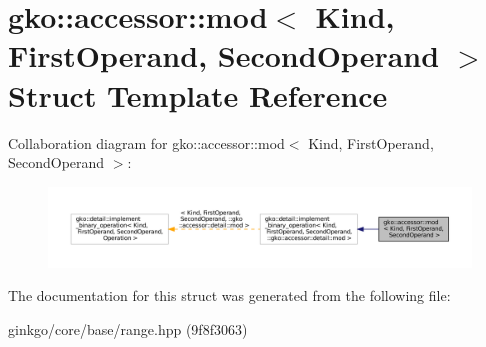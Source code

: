 \hypertarget{structgko_1_1accessor_1_1mod}{}\section{gko\+:\+:accessor\+:\+:mod$<$ Kind, First\+Operand, Second\+Operand $>$ Struct Template Reference}
\label{structgko_1_1accessor_1_1mod}


Collaboration diagram for gko\+:\+:accessor\+:\+:mod$<$ Kind, First\+Operand, Second\+Operand $>$\+:
\nopagebreak
\begin{figure}[H]
\begin{center}
\leavevmode
\includegraphics[width=350pt]{structgko_1_1accessor_1_1mod__coll__graph}
\end{center}
\end{figure}


The documentation for this struct was generated from the following file\+:\begin{DoxyCompactItemize}
\item 
ginkgo/core/base/range.\+hpp (9f8f3063)\end{DoxyCompactItemize}
